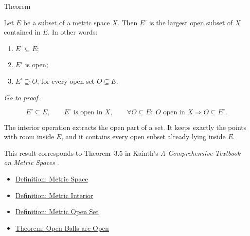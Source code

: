 \begin{theorembox}{Theorem}
\begin{theorem}
\label{thm:metric-interior-largest-open-subset}
Let \(E\) be a subset of a metric space \(X\).  Then \(E^\circ\) is the
largest open subset of \(X\) contained in \(E\).  In other words:
\begin{enumerate}
  \item \(E^\circ\subseteq E\);
  \item \(E^\circ\) is open;
  \item \(E^\circ\supseteq O\), for every open set \(O\subseteq E\).
\end{enumerate}

\smallskip
\noindent
\hyperref[prf:metric-interior-largest-open-subset]{\textit{Go to proof.}}
\end{theorem}
\end{theorembox}

\begin{remark*}
\[
E^\circ\subseteq E,
\qquad
E^\circ\text{ is open in }X,
\qquad
\forall O\subseteq E{:}\;
O\text{ open in }X\Longrightarrow O\subseteq E^\circ.
\]
\end{remark*}

\begin{remark*}[Interpretation]
The interior operation extracts the open part of a set.  It keeps exactly the
points with room inside \(E\), and it contains every open subset already lying
inside \(E\).
\end{remark*}

\begin{remark*}
This result corresponds to Theorem~3.5 in Kainth's
\emph{A Comprehensive Textbook on Metric Spaces}
\cite{KainthComprehensiveMetricSpaces2023}.
\end{remark*}

\begin{dependencies}
\begin{itemize}
  \item \hyperref[def:metric-space]{Definition: Metric Space}
  \item \hyperref[def:metric-interior]{Definition: Metric Interior}
  \item \hyperref[def:metric-open-set]{Definition: Metric Open Set}
  \item \hyperref[thm:metric-open-balls-are-open]{Theorem: Open Balls are Open}
\end{itemize}
\end{dependencies}

